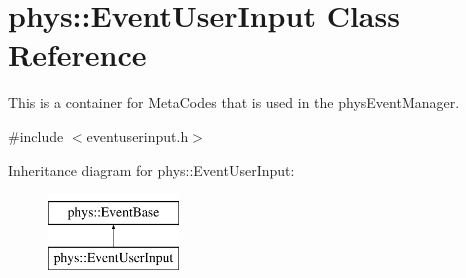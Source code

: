 \hypertarget{classphys_1_1EventUserInput}{
\section{phys::EventUserInput Class Reference}
\label{d7/df5/classphys_1_1EventUserInput}
}


This is a container for MetaCodes that is used in the physEventManager.  




{\ttfamily \#include $<$eventuserinput.h$>$}

Inheritance diagram for phys::EventUserInput:\begin{figure}[H]
\begin{center}
\leavevmode
\includegraphics[height=2.000000cm]{d7/df5/classphys_1_1EventUserInput}
\end{center}
\end{figure}
